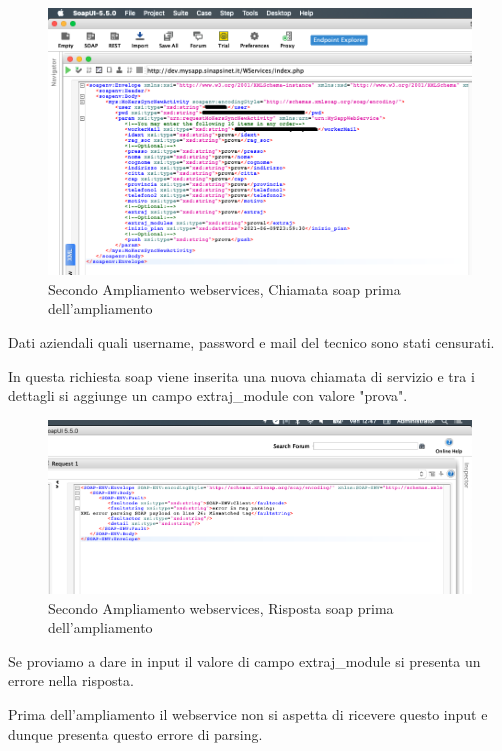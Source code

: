 \begin{figure}[!h] 
	\centering
	\includegraphics[scale = 0.5]{immagini/webservices/ampliamenti/accettazione/2ampl_soap_chiamata_premodifica.png}
	\caption{Secondo Ampliamento webservices, Chiamata  \gls{soap} prima dell'ampliamento}
	\label{fig:5-10}
\end{figure}
\begin{flushleft}
	Dati aziendali quali username, password e mail del tecnico sono stati censurati.
	
	In questa richiesta \gls{soap} viene inserita una nuova chiamata di servizio e tra i dettagli si aggiunge un campo extraj\_module con valore "prova".
\end{flushleft}
\begin{figure}[!h] 
	\centering
	\includegraphics[scale = 0.5]{immagini/webservices/ampliamenti/accettazione/2ampl_soap_risposta_premodifica.png}
	\caption{Secondo Ampliamento webservices, Risposta \gls{soap} prima dell'ampliamento}
	\label{fig:5-11}
\end{figure}
\begin{flushleft}
	Se proviamo a dare in input il valore di campo extraj\_module si presenta un errore nella risposta.
	
	Prima dell'ampliamento il webservice non si aspetta di ricevere questo input e dunque presenta questo errore di parsing.
\end{flushleft}
\newpage


